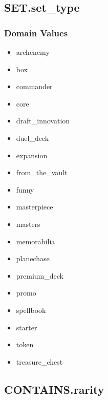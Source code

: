 \documentclass{article}
\begin{document}
\subsection{SET.set\_type}
\subsubsection{Domain Values}
\begin{multicols}{3}
    \begin{itemize}
            \item archenemy
            \item box
            \item commander
            \item core
            \item draft\_innovation
            \item duel\_deck
            \item expansion
            \item from\_the\_vault
            \item funny
            \item masterpiece
            \item masters
            \item memorabilia
            \item planechase
            \item premium\_deck
            \item promo
            \item spellbook
            \item starter
            \item token
            \item treasure\_chest
    \end{itemize}
\end{multicols}

\subsection{CONTAINS.rarity}
\end{document}
